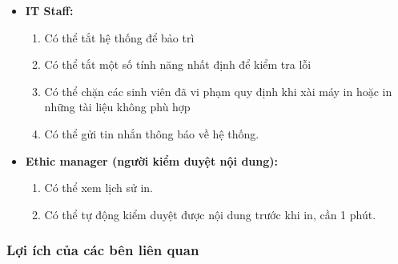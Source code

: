 \begin{itemize}
    \item \textbf{IT Staff:}
    \begin{enumerate}[- ]
        \item Có thể tắt hệ thống để bảo trì
        \item Có thể tắt một số tính năng nhất định để kiểm tra lỗi
        \item Có thể chặn các sinh viên đã vi phạm quy định khi xài máy in hoặc in những tài liệu không phù hợp
        \item Có thể gửi tin nhắn thông báo về hệ thống.
    \end{enumerate}

    \item \textbf{Ethic manager (người kiểm duyệt nội dung):}
    \begin{enumerate}[- ]
        \item Có thể xem lịch sử in.
        \item Có thể tự động kiểm duyệt được nội dung trước khi in, cần 1 phút.
    \end{enumerate}

\end{itemize}


\subsubsection{Lợi ích của các bên liên quan}\par

